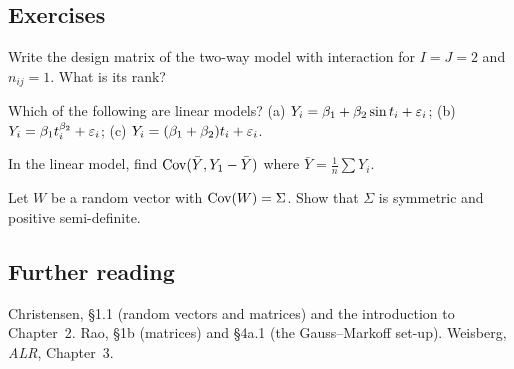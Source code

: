 \subsection{Exercises}
\begin{problem}\label{prob:L09-1}
Write the design matrix of the two-way model with interaction for $I=J=2$ and $n_{ij}=1$. What is its rank?
\end{problem}
\begin{problem}\label{prob:L09-2}
Which of the following are linear models? (a) $Y_i=\beta_1+\beta_2\sin t_i+\varepsilon_i$; (b) $Y_i=\beta_1t_i^{\beta_2}+\varepsilon_i$; (c) $Y_i=(\beta_1+\beta_2)t_i+\varepsilon_i$.
\end{problem}
\begin{problem}\label{prob:L09-3}
In the linear model, find $\operatorname{Cov}(\bar Y,Y_1-\bar Y)$ where $\bar Y=\frac1n\sum Y_i$.
\end{problem}
\begin{problem}\label{prob:L09-4}
Let $W$ be a random vector with $\operatorname{Cov}(W)=\Sigma$. Show that $\Sigma$ is symmetric and positive semi-definite.
\end{problem}

\subsection{Further reading}
Christensen, \S1.1 (random vectors and matrices) and the introduction to Chapter~2. Rao, \S1b
(matrices) and \S4a.1 (the Gauss--Markoff set-up). Weisberg, \emph{ALR}, Chapter~3.
